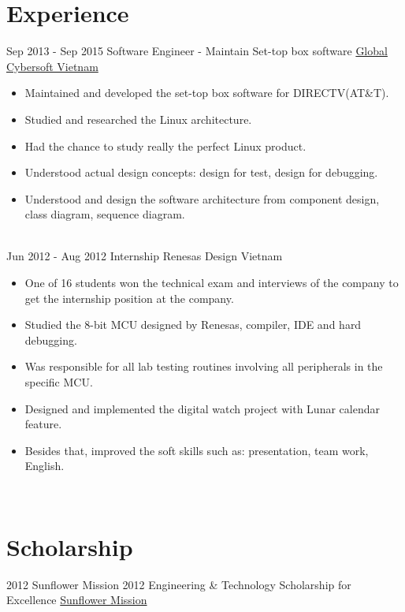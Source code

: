 \documentclass[letterpaper]{twentysecondcv} %
\begin{document}
\section{Experience}
\begin{twenty}
	\twentyitem
	{Sep 2013 -}
	{Sep 2015}
	{Software Engineer - Maintain Set-top box software}
	{\href{http://www.globalcybersoft.com/en}{Global Cybersoft Vietnam}}
	{}
	{
		{\begin{itemize}
				\item Maintained and developed the set-top box software for DIRECTV(AT\&T).
				\item Studied and researched the Linux architecture.
				\item Had the chance to study really the perfect Linux product.
				\item Understood actual design concepts: design for test, design for debugging.
				\item Understood and design the software architecture from component design, class diagram, sequence diagram.
		\end{itemize}}
	}
	\\
	\twentyitem
	{Jun 2012 -}
	{Aug 2012}
	{Internship}
	{{Renesas Design Vietnam}}
	{}
	{
		\begin{itemize}
			\item One of 16 students won the technical exam and interviews of the company to get the internship position at the company.
			\item Studied the 8-bit MCU designed by Renesas, compiler, IDE and hard debugging.
			\item Was responsible for all lab testing routines involving all peripherals in the specific MCU.
			\item Designed and implemented the digital watch project with Lunar calendar feature.
			\item Besides that, improved the soft skills such as: presentation, team work, English.
		\end{itemize}
	}
	    \\   

\end{twenty}

\section{Scholarship}
\begin{twenty}
	\twentyitem
	{2012}
	{}
	{Sunflower Mission 2012 Engineering \& Technology Scholarship for Excellence}
	{\href{https://www.esilicon.com/company/careers/scholarships-in-vietnam}{Sunflower Mission}}
	{}
	
\end{twenty}
\end{document}
